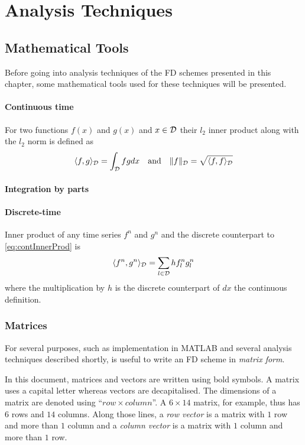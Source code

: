 \chapter{Analysis Techniques}\label{ch:analysis}

\section{Mathematical Tools}

Before going into analysis techniques of the FD schemes presented in this chapter, some mathematical tools used for these techniques will be presented. 


\subsubsection{Continuous time}
For two functions $f(x)$ and $g(x)$ and $x\in\mathcal{D}$ their $l_2$ inner product along with the $l_2$ norm is defined as
\begin{equation}\label{eq:contInnerProd}
    \langle f, g\rangle_{\mathcal{D}} = \int_{\mathcal{D}} fg dx \quad \text{and} \quad \lVert f \rVert_{\mathcal{D}} = \sqrt{\langle f, f \rangle_{\mathcal{D}}}
\end{equation}

\subsubsection{Integration by parts}


\subsubsection{Discrete-time}
Inner product of any time series $f^n$ and $g^n$ and the discrete counterpart to \eqref{eq:contInnerProd} is
\begin{equation}\label{eq:discInnerProd}
    \langle f^n, g^n \rangle_{\mathcal{D}} = \sum_{l\in\mathcal{D}} h f_l^n g_l^n
\end{equation}
where the multiplication by $h$ is the discrete counterpart of $dx$ the continuous definition. 


\subsection{Matrices}
For several purposes, such as implementation in MATLAB and several analysis techniques described shortly, is useful to write an FD scheme in \textit{matrix form}. 

In this document, matrices and vectors are written using bold symbols.  A matrix uses a capital letter whereas vectors are decapitalised. The dimensions of a matrix are denoted using ``$row \times column$''. A $6\times 14$ matrix, for example, thus has $6$ rows and $14$ columns. Along those lines, a \textit{row vector} is a matrix with $1$ row and more than $1$ column and a \textit{column vector} is a matrix with $1$ column and more than $1$ row. 

